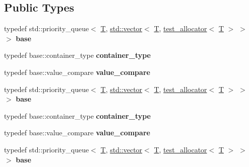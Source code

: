 \subsection*{Public Types}
\begin{DoxyCompactItemize}
\item 
\mbox{\label{structtest_a0e2f4e0bfb5de2fdb182d0f34c27fe7b}} 
typedef std\+::priority\+\_\+queue$<$ \mbox{\hyperlink{struct_t}{T}}, \mbox{\hyperlink{classstd_1_1vector}{std\+::vector}}$<$ \mbox{\hyperlink{struct_t}{T}}, \mbox{\hyperlink{classtest__allocator}{test\+\_\+allocator}}$<$ \mbox{\hyperlink{struct_t}{T}} $>$ $>$ $>$ {\bfseries base}
\item 
\mbox{\label{structtest_a73247bd60092d6e305cfa4fe71ba65a8}} 
typedef base\+::container\+\_\+type {\bfseries container\+\_\+type}
\item 
\mbox{\label{structtest_adfa36bc6fd0cc112b780555f966052fc}} 
typedef base\+::value\+\_\+compare {\bfseries value\+\_\+compare}
\item 
\mbox{\label{structtest_a0e2f4e0bfb5de2fdb182d0f34c27fe7b}} 
typedef std\+::priority\+\_\+queue$<$ \mbox{\hyperlink{struct_t}{T}}, \mbox{\hyperlink{classstd_1_1vector}{std\+::vector}}$<$ \mbox{\hyperlink{struct_t}{T}}, \mbox{\hyperlink{classtest__allocator}{test\+\_\+allocator}}$<$ \mbox{\hyperlink{struct_t}{T}} $>$ $>$ $>$ {\bfseries base}
\item 
\mbox{\label{structtest_a73247bd60092d6e305cfa4fe71ba65a8}} 
typedef base\+::container\+\_\+type {\bfseries container\+\_\+type}
\item 
\mbox{\label{structtest_adfa36bc6fd0cc112b780555f966052fc}} 
typedef base\+::value\+\_\+compare {\bfseries value\+\_\+compare}
\item 
\mbox{\label{structtest_a0e2f4e0bfb5de2fdb182d0f34c27fe7b}} 
typedef std\+::priority\+\_\+queue$<$ \mbox{\hyperlink{struct_t}{T}}, \mbox{\hyperlink{classstd_1_1vector}{std\+::vector}}$<$ \mbox{\hyperlink{struct_t}{T}}, \mbox{\hyperlink{classtest__allocator}{test\+\_\+allocator}}$<$ \mbox{\hyperlink{struct_t}{T}} $>$ $>$ $>$ {\bfseries base}
\item 
\mbox{\label{structtest_a73247bd60092d6e305cfa4fe71ba65a8}} 

\end{DoxyCompactItemize}
